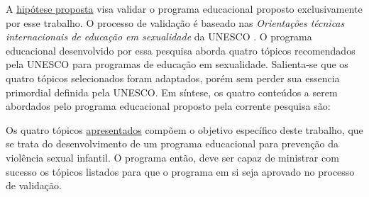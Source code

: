\vspace{-0.2cm}

A \hyperref[hipotese]{hipótese proposta} visa validar o programa educacional proposto exclusivamente por esse trabalho. O processo de validação é baseado nas \textit{Orientações técnicas internacionais de educação em sexualidade} da UNESCO \cite{women2018international}. O programa educacional desenvolvido por essa pesquisa aborda quatro tópicos recomendados pela UNESCO para programas de educação em sexualidade. Salienta-se que os quatro tópicos selecionados foram adaptados, porém sem perder sua essencia primordial definida pela UNESCO.  Em síntese, os quatro conteúdos a serem abordados pelo programa educacional proposto pela corrente pesquisa são:

\vspace{0.6cm}

\vspace{-0.6cm}
\begin{framed}
  \begin{parcolumns}{2}
    \vspace{-0.5cm}
  
  \end{parcolumns}
\end{framed}

\vspace{-0.2cm}

Os quatro tópicos \hyperref[topicos]{apresentados} compõem o objetivo específico deste trabalho, que se trata do desenvolvimento de um programa educacional para prevenção da violência sexual infantil. O programa então, deve ser capaz de ministrar com sucesso os tópicos listados para que o programa em si seja aprovado no processo de validação. 

